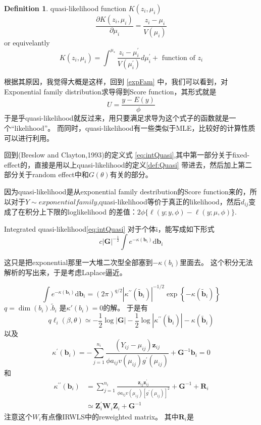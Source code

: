 \documentclass[
]{book}
\theoremstyle{definition}
\newtheorem{definition}{Definition}[chapter]
\theoremstyle{definition}
\theoremstyle{definition}
\theoremstyle{remark}
\begin{document}
\begin{definition}
\protect\hypertarget{def:Quasi}{}{\label{def:Quasi} }quasi-likelihood function \(K(z_i,\mu_i)\)
\[
\frac{\partial K\left(z_{i}, \mu_{i}\right)}{\partial \mu_{i}}=\frac{z_{i}-\mu_{i}}{V\left(\mu_{i}\right)}
\]
or equivelantly
\[
K\left(z_{i}, \mu_{i}\right)=\int^{\mu_{*}} \frac{z_{i}-\mu_{i}^{\prime}}{V\left(\mu_{i}^{\prime}\right)} d \mu_{i}^{\prime}+\text { function of } z_{i}  
\]
\end{definition}
根据其原因，我觉得大概是这样，回到 \ref{expFam} 中，我们可以看到，对Exponential family distribution求导得到Score function，其形式就是
\[
U=\frac{y-E(y)}{\phi}
\]
于是乎quasi-likelihood就反过来，用只要满足求导为这个式子的函数就是一个``likelihood''。
而同时，quasi-likelihood有一些类似于MLE，比较好的计算性质可以进行利用。

回到(Breslow and Clayton,1993)的定义式 \eqref{eq:intQuasi},其中第一部分关于fixed-effect的，直接是用以上quasi-likelihood的定义\ref{def:Quasi} 带进去，然后加上第二部分关于random effect中和\(G(\theta)\)有关的部分。

因为quasi-likelihood是从exponential family destribution的Score function来的，所以对于\(Y\sim exponential family\),quasi-likelihood等价于真正的likelihood，然后\(d_{ij}\)变成了在积分上下限的loglikelihood 的差值：\(2 \phi\{\ell(y ; y, \phi)-\ell(y ; \mu, \phi)\}\).

Integrated quasi-likelihood\eqref{eq:intQuasi} 对于个体i，能写成如下形式
\[
c|\mathbf{G}|^{-\frac{1}{2}} \int e^{-\kappa\left(\mathbf{b}_{i}\right)} \mathrm{d} \mathbf{b}_{i}
\]

这只是把exponential那里一大堆二次型全部塞到\(-\kappa(b_i)\)里面去。
这个积分无法解析的写出来，于是考虑Laplace逼近。

\[
\int e^{-\kappa\left(\mathbf{b}_{i}\right)} \mathrm{d} \mathbf{b}_{i}=(2 \pi)^{q / 2}\left|\kappa^{\prime \prime}\left(\tilde{\mathbf{b}}_{i}\right)\right|^{-1 / 2} \exp \left\{-\kappa\left(\tilde{\mathbf{b}}_{i}\right)\right\}
\]
\(q=\operatorname{dim}(b_i)\).\(\tilde b_i\) 是\(\kappa'(b_i)=0\)的解。
于是有
\[
\begin{equation}
q \ell_{i}(\beta, \theta) \simeq-\frac{1}{2} \log |\mathbf{G}|-\frac{1}{2} \log \left|\kappa^{\prime \prime}\left(\tilde{\mathbf{b}}_{i}\right)\right|-\kappa\left(\tilde{\mathbf{b}}_{i}\right)
\label{eq:quasiLikeKappa}
\end{equation}
\]
以及
\[
\kappa^{\prime}\left(\mathbf{b}_{i}\right)=-\sum_{j=1}^{n_{i}} \frac{\left(Y_{i j}-\mu_{i j}\right) \mathbf{z}_{i j}}{\phi a_{i j} v\left(\mu_{i j}\right) g^{\prime}\left(\mu_{i j}\right)}+\mathbf{G}^{-1} \mathbf{b}_{i}=0
\]
和
\[
\begin{aligned} \kappa^{\prime \prime}\left(\mathbf{b}_{i}\right) &=\sum_{j=1}^{n_{i}} \frac{\mathbf{z}_{i j} \mathbf{z}_{i j}^{\prime}}{\phi a_{i j} v\left(\mu_{i j}\right)\left[g^{\prime}\left(\mu_{i j}\right)\right]^{2}}+\mathbf{G}^{-1}+\mathbf{R}_{i} \\ & \simeq \mathbf{Z}_{i}^{\prime} \mathbf{W}_{i} \mathbf{Z}_{i}+\mathbf{G}^{-1} \end{aligned}
\]
注意这个\(W_i\)有点像IRWLS中的reweighted matrix。
其中\(\boldsymbol R_i\)是
\end{document}
